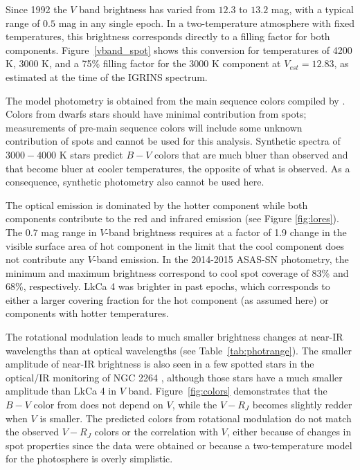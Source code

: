 \documentclass[twocolumn]{emulateapj}%
\begin{document}
Since 1992 the $V$ band brightness has varied from $12.3$ to $13.2$ mag, with a typical range of $0.5$ mag in any single epoch.  In a two-temperature atmosphere with fixed temperatures, this brightness corresponds directly to a filling factor for both components.  Figure~\ref{vband_spot} shows this conversion for temperatures of 4200 K, 3000 K, and a 75\% filling factor for the 3000 K component at $V_{est}=12.83$, as estimated at the time of the IGRINS spectrum.  

The model photometry is obtained from the main sequence colors compiled by \citet{kenyon95}.  Colors from dwarfs stars should have minimal contribution from spots; measurements of pre-main sequence colors will include some unknown contribution of spots and cannot be used for this analysis.  Synthetic spectra of $3000-4000$ K stars predict $B-V$ colors that are much bluer than observed and that become bluer at cooler temperatures, the opposite of what is observed.  As a consequence, synthetic photometry also cannot be used here.  

The optical emission is dominated by the hotter component while both components contribute to the red and infrared emission (see Figure \ref{fig:lores}).  The $0.7$ mag range in $V$-band brightness requires at a factor of 1.9 change in the visible surface area of hot component in the limit that the cool component does not contribute any $V$-band emission.  In the 2014-2015 ASAS-SN photometry, the minimum and maximum brightness correspond to cool spot coverage of 83\% and 68\%, respectively.  LkCa 4 was brighter in past epochs, which corresponds to either a larger covering fraction for the hot component (as assumed here) or components with hotter temperatures.

The rotational modulation leads to much smaller brightness changes at near-IR wavelengths than at optical wavelengths (see Table~\ref{tab:photrange}).  The smaller amplitude of near-IR brightness is also seen in a few spotted stars in the optical/IR monitoring of NGC 2264 \citep{cody14}, although those stars have a much smaller amplitude than LkCa 4 in $V$ band.  Figure~\ref{fig:colors} demonstrates that the $B-V$ color from \citet{grankin08} does not depend on $V$, while the $V-R_J$ becomes slightly redder when $V$ is smaller.  The predicted colors from rotational modulation do not match the observed $V-R_J$ colors or the correlation with $V$, either because of changes in spot properties since the \citet{grankin08} data were obtained or because a two-temperature model for the photosphere is overly simplistic.
\end{document}
